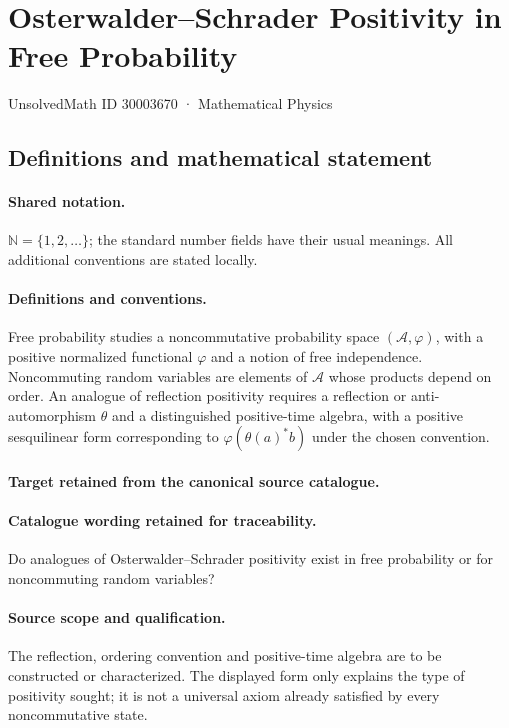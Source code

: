 \documentclass[11pt]{article}
\begin{document}
\setcounter{section}{30003669}
\section{Osterwalder–Schrader Positivity in Free Probability}\label{30003670}
{\small UnsolvedMath ID 30003670 · Mathematical Physics}
\subsection{Definitions and mathematical statement}

\paragraph{Shared notation.}$\mathbb N=\{1,2,\ldots\}$; the standard number fields have their usual meanings. All additional conventions are stated locally.


\paragraph{Definitions and conventions.}
Free probability studies a noncommutative probability space $(\mathcal A,\varphi)$, with a positive normalized functional $\varphi$ and a notion of free independence. Noncommuting random variables are elements of $\mathcal A$ whose products depend on order. An analogue of reflection positivity requires a reflection or anti-automorphism $\theta$ and a distinguished positive-time algebra, with a positive sesquilinear form corresponding to $\varphi(\theta(a)^*b)$ under the chosen convention.

\paragraph{Target retained from the canonical source catalogue.}
\paragraph{Catalogue wording retained for traceability.}
Do analogues of Osterwalder–Schrader positivity exist in free probability or for noncommuting random variables?

\paragraph{Source scope and qualification.}
The reflection, ordering convention and positive-time algebra are to be constructed or characterized. The displayed form only explains the type of positivity sought; it is not a universal axiom already satisfied by every noncommutative state.
\end{document}
